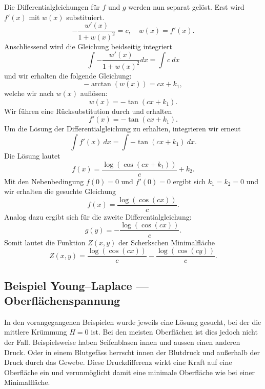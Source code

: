 \begin{refsection}
Die Differentialgleichungen für $f$ und $g$ werden nun separat gelöst. Erst wird $f'(x)$ mit $w(x)$ substituiert. 
\begin{equation}\label{ScherkDGL1}
-\dfrac{w'(x)}{1+w(x)^2}= c  , \quad w(x)=f'(x).
\end{equation}
Anschliessend wird die Gleichung  beidseitig integriert
\begin{equation}
\int -\dfrac{w'(x)}{1+w(x)^2} dx = \int c \ dx
\end{equation}
und wir erhalten die folgende Gleichung:
\begin{equation}
-\arctan(w(x)) = cx+k_1,
\end{equation}
welche wir nach $w(x)$ auflösen:
\begin{equation}
w(x) = -\tan(cx+k_1).
\end{equation}
Wir führen eine Rücksubstitution durch und erhalten
\begin{equation}\label{SchreckDGL2}
f'(x) = -\tan(cx+k_1).
\end{equation}
Um die Lösung der Differentialgleichung zu erhalten, integrieren wir erneut
\begin{equation}
\int f'(x)\ dx = \int -\tan(cx+k_1)\ dx.
\end{equation}
 Die Lösung lautet
\begin{equation}
f(x) = \dfrac{\log(\cos(cx+k_1))}{c}+k_2.
\end{equation}
Mit den Nebenbedingung $f(0)=0$ und $f'(0)=0$ ergibt sich $k_1=k_2=0$ und wir erhalten die gesuchte Gleichung 
\begin{equation}
f(x) = \dfrac{\log(\cos(cx))}{c}.
\end{equation}
Analog dazu ergibt sich für die zweite Differentialgleichung:
\begin{equation}
g(y) = - \dfrac{\log(\cos(cx))}{c}.
\end{equation}
Somit lautet die Funktion $Z(x,y)$ der Scherkschen Minimalfläche
\begin{equation}
Z(x,y)=\dfrac{\log(\cos(cx))}{c}-\dfrac{\log(\cos(cy))}{c}.
\end{equation}

\subsection{Beispiel Young–Laplace --- Oberflächenspannung}
\label{Young-Laplace}
%

\label{YL-Beschreibung}
In den vorangegangenen Beispielen wurde jeweils eine Lösung gesucht, bei der die mittlere Krümmung $H=0$ ist. Bei den meisten Oberflächen ist dies jedoch nicht der Fall. Beispielsweise haben Seifenblasen innen und aussen einen anderen Druck. Oder in einem Blutgefäss herrscht innen der Blutdruck und außerhalb der Druck durch das Gewebe. Diese Druckdifferenz wirkt eine Kraft auf eine Oberfläche ein und verunmöglicht damit eine minimale Oberfläche wie bei einer Minimalfläche.


\end{refsection}
